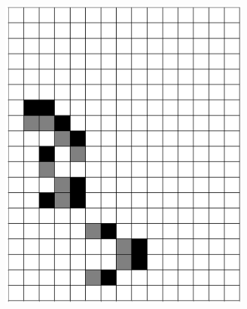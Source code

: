 \documentclass[12pt]{article}
\numberwithin{figure}{section} %
\begin{document}
\begin{figure}[H]
\begin{subfigure}{0.3\textwidth}
     \subcaption{}
   \end{subfigure}
   
   \begin{subfigure}{0.3\textwidth}
     \centering
     \includegraphics[width=\linewidth]{Section4/29.3}
     \subcaption{}
   \end{subfigure}
     \begin{subfigure}{0.3\textwidth}
     \centering

\end{subfigure}
\end{figure}
\end{document}
